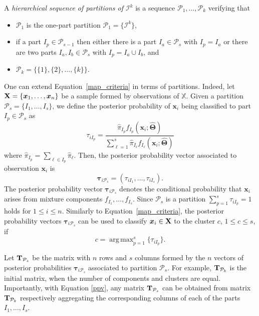 \documentclass[submit]{smj}
\DeclareMathOperator*{\argmax}{arg\,max}
\theoremstyle{definition}
\newcommand{\m}[1]{\boldsymbol{#1}}
\newcommand{\X}{\text{\textbf{X}}}
\begin{document}
A \emph{hierarchical sequence of partitions of $\mathcal{I}^k$} is a sequence $\mathcal{P}_1, \dots, \mathcal{P}_k$ verifying that
\begin{itemize}
\item $\mathcal{P}_1$ is the one-part partition $\mathcal{P}_1 = \{ \mathcal{I}^k \}$,
\item if a part $I_p \in \mathcal{P}_{s-1}$ then either there is a part $I_a \in \mathcal{P}_{s}$ with $I_p = I_a$ or there are two parts $I_a, I_b \in \mathcal{P}_s$ with $I_p = I_a \cup I_b$, and
\item $\mathcal{P}_k= \{ \{1\},\{2\}, \dots, \{k\} \}$.
\end{itemize}



One can extend Equation~\ref{map_criteria} in terms of partitions. Indeed, let $\X = \{\m x_1,\dots, \m x_n\}$ be a sample formed by observations of $\mathbb{X}$. Given a partition $\mathcal{P}_s = \{ I_1, \dots, I_s \}$, we define the posterior probability of $\m x_i$ being classified to part $I_p\in \mathcal{P}_{s}$ as
\[
\tau_{i I_p} =  \frac{ \hat{\pi}_{I_p} f_{I_p}(\m x_i; \hat{\m\Theta}) }{\sum_{\ell=1}^s \hat{\pi}_{I_\ell} f_{I_\ell}(\m x_i; \hat{\m\Theta})}
\]
where $\hat{\pi}_{I_p} = \sum_{\ell \in I_p} \hat{\pi}_\ell$. Then, the posterior probability vector associated to observation $\m x_i$ is
\begin{equation}\label{ppv}
\m\tau_{i \mathcal{P}_s} = \left(\tau_{i I_1} , \dots, \tau_{i I_s}  \right).
\end{equation}
The posterior probability vector $\m \tau_{i \mathcal{P}_s}$ denotes the conditional probability that $\m x_i$ arises from mixture components $f_{I_1}, \dots, f_{I_s}$. Since $\mathcal{P}_s$ is a partition $\sum_{p=1}^s \tau_{i I_p} = 1$ holds  for $1 \leq i \leq n$. Similarly to Equation~\ref{map_criteria}, the posterior probability vectors $\m\tau_{i \mathcal{P}_s}$ can be used to classify $\m x_i \in \X$ to the cluster $c$, $1\leq c\leq s$, if
\begin{equation}\label{cluster_criteria}
c= \argmax_{p=1}^s \{ \tau_{i I_p} \}.
\end{equation}

Let $\text{\textbf{T}}_{\mathcal{P}_s}$ be the matrix with $n$ rows and $s$ columns formed by the $n$ vectors of posterior probabilities $\m \tau_{i\mathcal{P}_s}$ associated to partition $\mathcal{P}_s$. For example, $\text{\textbf{T}}_{\mathcal{P}_k}$ is the initial matrix, when the number of components and clusters are equal. Importantly, with Equation \ref{ppv}, any matrix $\text{\textbf{T}}_{\mathcal{P}_s}$ can be obtained from matrix $\text{\textbf{T}}_{\mathcal{P}_k}$ respectively aggregating the corresponding columns of each of the parts $I_1, \dots, I_s$.
\end{document}
